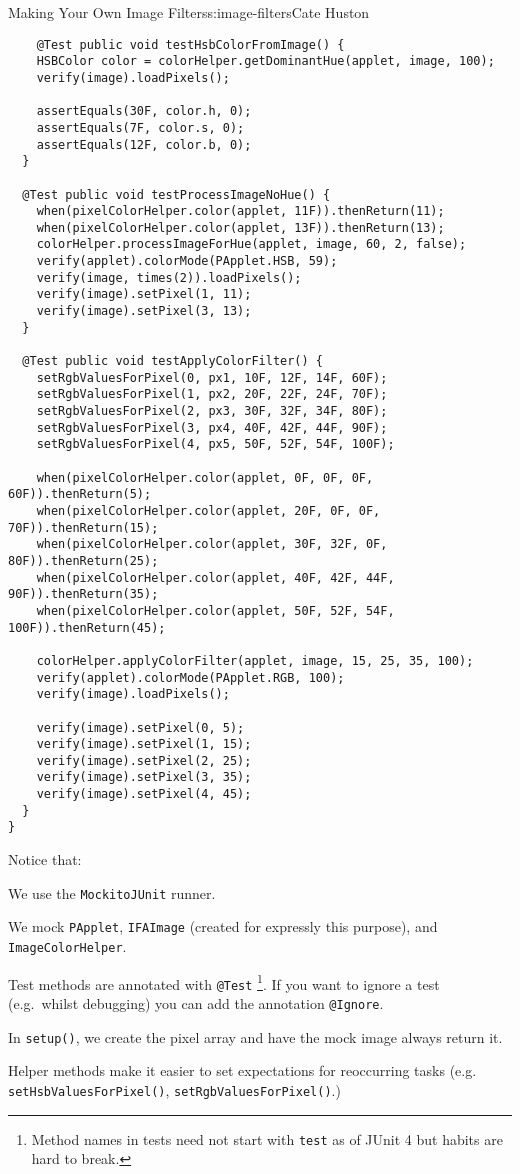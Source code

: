\begin{aosachapter}{Making Your Own Image Filters}{s:image-filters}{Cate Huston}
\begin{verbatim}
    @Test public void testHsbColorFromImage() {
    HSBColor color = colorHelper.getDominantHue(applet, image, 100);
    verify(image).loadPixels();

    assertEquals(30F, color.h, 0);
    assertEquals(7F, color.s, 0);
    assertEquals(12F, color.b, 0);
  }

  @Test public void testProcessImageNoHue() {
    when(pixelColorHelper.color(applet, 11F)).thenReturn(11);
    when(pixelColorHelper.color(applet, 13F)).thenReturn(13);
    colorHelper.processImageForHue(applet, image, 60, 2, false);
    verify(applet).colorMode(PApplet.HSB, 59);
    verify(image, times(2)).loadPixels();
    verify(image).setPixel(1, 11);
    verify(image).setPixel(3, 13);
  }

  @Test public void testApplyColorFilter() {
    setRgbValuesForPixel(0, px1, 10F, 12F, 14F, 60F);
    setRgbValuesForPixel(1, px2, 20F, 22F, 24F, 70F);
    setRgbValuesForPixel(2, px3, 30F, 32F, 34F, 80F);
    setRgbValuesForPixel(3, px4, 40F, 42F, 44F, 90F);
    setRgbValuesForPixel(4, px5, 50F, 52F, 54F, 100F);

    when(pixelColorHelper.color(applet, 0F, 0F, 0F, 60F)).thenReturn(5);
    when(pixelColorHelper.color(applet, 20F, 0F, 0F, 70F)).thenReturn(15);
    when(pixelColorHelper.color(applet, 30F, 32F, 0F, 80F)).thenReturn(25);
    when(pixelColorHelper.color(applet, 40F, 42F, 44F, 90F)).thenReturn(35);
    when(pixelColorHelper.color(applet, 50F, 52F, 54F, 100F)).thenReturn(45);

    colorHelper.applyColorFilter(applet, image, 15, 25, 35, 100);
    verify(applet).colorMode(PApplet.RGB, 100);
    verify(image).loadPixels();

    verify(image).setPixel(0, 5);
    verify(image).setPixel(1, 15);
    verify(image).setPixel(2, 25);
    verify(image).setPixel(3, 35);
    verify(image).setPixel(4, 45);
  }
}
\end{verbatim}

Notice that:

\begin{aosaitemize}

\item
  We use the \texttt{MockitoJUnit} runner.
\item
  We mock \texttt{PApplet}, \texttt{IFAImage} (created for expressly
  this purpose), and \texttt{ImageColorHelper}.
\item
  Test methods are annotated with \texttt{@Test} \footnote{Method names
    in tests need not start with \texttt{test} as of JUnit 4 but habits
    are hard to break.}. If you want to ignore a test (e.g.~whilst
  debugging) you can add the annotation \texttt{@Ignore}.
\item
  In \texttt{setup()}, we create the pixel array and have the mock image
  always return it.
\item
  Helper methods make it easier to set expectations for reoccurring
  tasks (e.g. \texttt{setHsbValuesForPixel()},
  \texttt{setRgbValuesForPixel()}.)
\end{aosaitemize}


\end{aosachapter}
